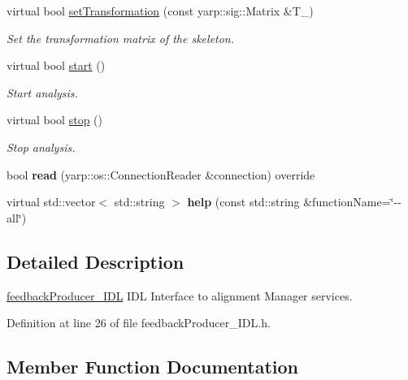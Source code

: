 \begin{DoxyCompactItemize}
virtual bool \mbox{\hyperlink{classfeedbackProducer__IDL_a0faabb9844bf01590a85e67bd857d7ac}{set\+Transformation}} (const yarp\+::sig\+::\+Matrix \&T\+\_\+)
\begin{DoxyCompactList}\small\item\em Set the transformation matrix of the skeleton. \end{DoxyCompactList}\item 
virtual bool \mbox{\hyperlink{classfeedbackProducer__IDL_a50c492862766e36f730439a3a8f0d910}{start}} ()
\begin{DoxyCompactList}\small\item\em Start analysis. \end{DoxyCompactList}\item 
virtual bool \mbox{\hyperlink{classfeedbackProducer__IDL_afdfffd0edb784e0a9906ed33e164027b}{stop}} ()
\begin{DoxyCompactList}\small\item\em Stop analysis. \end{DoxyCompactList}\item 
\mbox{\label{classfeedbackProducer__IDL_a6b15cd2302f577f6285099ec7f0bc043}} 
bool {\bfseries read} (yarp\+::os\+::\+Connection\+Reader \&connection) override
\item 
\mbox{\label{classfeedbackProducer__IDL_ab5c65785efc4edbc2d605511f4028c9f}} 
virtual std\+::vector$<$ std\+::string $>$ {\bfseries help} (const std\+::string \&function\+Name=\char`\"{}-\/-\/all\char`\"{})
\end{DoxyCompactItemize}


\subsection{Detailed Description}
\mbox{\hyperlink{classfeedbackProducer__IDL}{feedback\+Producer\+\_\+\+I\+DL}} I\+DL Interface to alignment Manager services. 

Definition at line 26 of file feedback\+Producer\+\_\+\+I\+D\+L.\+h.



\subsection{Member Function Documentation}
\mbox{\label{classfeedbackProducer__IDL_a509606998529f964664fa22b4457cee2}} 
